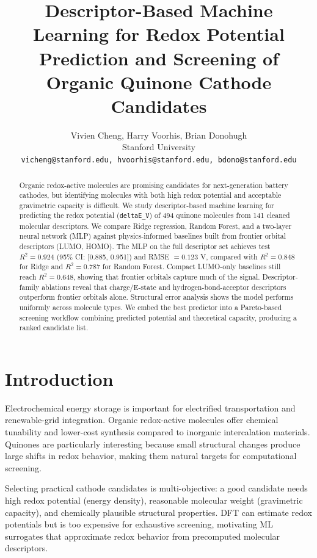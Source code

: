 \documentclass[11pt]{article}
\title{Descriptor-Based Machine Learning for Redox Potential Prediction and Screening of Organic Quinone Cathode Candidates}
\author{
Vivien Cheng, Harry Voorhis, Brian Donohugh\\
Stanford University\\
\texttt{vicheng@stanford.edu, hvoorhis@stanford.edu, bdono@stanford.edu}
}
\date{}
\begin{document}
\maketitle

\begin{abstract}
Organic redox-active molecules are promising candidates for next-generation battery cathodes, but identifying molecules with both high redox potential and acceptable gravimetric capacity is difficult. We study descriptor-based machine learning for predicting the redox potential (\texttt{deltaE\_V}) of 494 quinone molecules from 141 cleaned molecular descriptors. We compare Ridge regression, Random Forest, and a two-layer neural network (MLP) against physics-informed baselines built from frontier orbital descriptors (LUMO, HOMO). The MLP on the full descriptor set achieves test $R^2 = 0.924$ (95\% CI: [0.885, 0.951]) and RMSE $= 0.123$ V, compared with $R^2 = 0.848$ for Ridge and $R^2 = 0.787$ for Random Forest. Compact LUMO-only baselines still reach $R^2 = 0.648$, showing that frontier orbitals capture much of the signal. Descriptor-family ablations reveal that charge/E-state and hydrogen-bond-acceptor descriptors outperform frontier orbitals alone. Structural error analysis shows the model performs uniformly across molecule types. We embed the best predictor into a Pareto-based screening workflow combining predicted potential and theoretical capacity, producing a ranked candidate list.
\end{abstract}

\section{Introduction}

Electrochemical energy storage is important for electrified transportation and renewable-grid integration. Organic redox-active molecules offer chemical tunability and lower-cost synthesis compared to inorganic intercalation materials. Quinones are particularly interesting because small structural changes produce large shifts in redox behavior, making them natural targets for computational screening.

Selecting practical cathode candidates is multi-objective: a good candidate needs high redox potential (energy density), reasonable molecular weight (gravimetric capacity), and chemically plausible structural properties. DFT can estimate redox potentials but is too expensive for exhaustive screening, motivating ML surrogates that approximate redox behavior from precomputed molecular descriptors.
\end{document}
